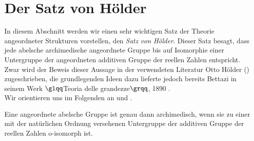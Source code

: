 \section{Der Satz von Hölder}
In diesem Abschnitt werden wir einen sehr wichtigen Satz der Theorie angeordneter Strukturen vorstellen, den \textit{Satz von Hölder}. Dieser Satz besagt, dass jede abelsche archimedische angeordnete Gruppe bis auf Isomorphie einer Untergruppe der angeordneten additiven Gruppe der reellen Zahlen entspricht. Zwar wird der Beweis dieser Aussage in der verwendeten Literatur Otto Hölder (\cite{hoelder1901}) zugeschrieben, die grundlegenden Ideen dazu lieferte jedoch bereits Bettazi in seinem Werk $\glqq$Teoria delle grandezze$\grqq$, 1890 \cite[S. 578]{Lueneburg08}.\\
Wir orientieren uns im Folgenden an \cite{hoelder1901} und \cite{priesscrampe83}. 
\begin{satz}\label{aga} %
Eine angeordnete abelsche Gruppe ist genau dann archimedisch, wenn sie zu einer mit der natürlichen Ordnung versehenen Untergruppe der additiven Gruppe der reellen Zahlen o-isomorph ist.
\end{satz}
%
%
